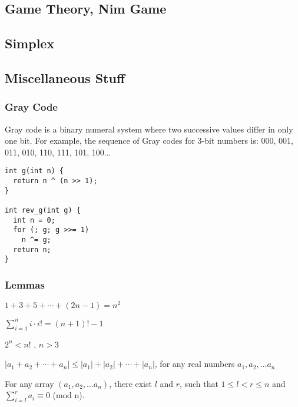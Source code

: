 \subsection{Game Theory, Nim Game}
\subsection{Simplex}

\newpage

\subsection{Miscellaneous Stuff}

\subsubsection{Gray Code}

Gray code is a binary numeral system where two successive values differ in only one bit. \cite{GrayCode_CPAlgo}
For example, the sequence of Gray codes for 3-bit numbers is: 000, 001, 011, 010, 110, 111, 101, 100...

\begin{lstlisting}
int g(int n) {
  return n ^ (n >> 1);
}

int rev_g(int g) {
  int n = 0;
  for (; g; g >>= 1)
    n ^= g;
  return n;
}
\end{lstlisting}

\subsubsection{Lemmas}

\begin{lemma}
$1 + 3 + 5 + \cdots + (2n - 1) = n^2$
\end{lemma}

\begin{lemma}
$\displaystyle \sum_{i=1}^{n} i \cdot i! = (n + 1)! - 1$
\end{lemma}

\begin{lemma}
  $2^n < n!$ , $n > 3$
\end{lemma}

\begin{lemma}
  $|a_1+a_2+\cdots+a_n| \leq |a_1| + |a_2| + \cdots + |a_n|$, for any real numbers $a_1, a_2, \dots a_n$
\end{lemma}

\begin{lemma}
  For any array $(a_1, a_2, \dots a_n)$, there exist $l$ and $r$, such that $1 \leq l < r \leq n$ and \\ $\displaystyle \sum_{i=l}^{r} a_i \equiv 0$ (mod n).
\end{lemma}
